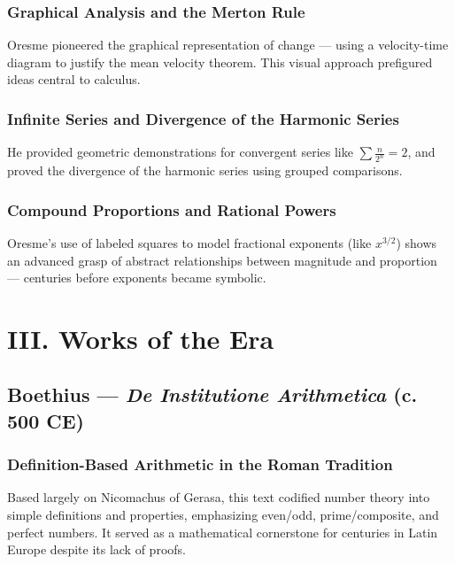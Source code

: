 \documentclass[9pt]{article}
\begin{document}
\subsubsection*{Graphical Analysis and the Merton Rule}

Oresme pioneered the graphical representation of change — using a velocity-time diagram to justify the mean velocity theorem.  
This visual approach prefigured ideas central to calculus.

\subsubsection*{Infinite Series and Divergence of the Harmonic Series}

He provided geometric demonstrations for convergent series like \( \sum \frac{n}{2^n} = 2 \), and proved the divergence of the harmonic series using grouped comparisons.

\subsubsection*{Compound Proportions and Rational Powers}

Oresme’s use of labeled squares to model fractional exponents (like \( x^{3/2} \)) shows an advanced grasp of abstract relationships between magnitude and proportion — centuries before exponents became symbolic.

\newpage

\section*{III. Works of the Era}

\subsection*{Boethius — \textit{De Institutione Arithmetica} (c. 500 CE)}

\subsubsection*{Definition-Based Arithmetic in the Roman Tradition}

Based largely on Nicomachus of Gerasa, this text codified number theory into simple definitions and properties, emphasizing even/odd, prime/composite, and perfect numbers.  
It served as a mathematical cornerstone for centuries in Latin Europe despite its lack of proofs.
\end{document}
